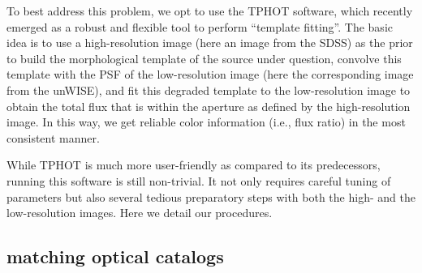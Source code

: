 \documentclass[numberedappendix,apj,twocolumn]{emulateapj}
\begin{document}
To best address this problem, we opt to use the TPHOT software, which recently emerged as a robust and flexible tool to perform ``template fitting''. The basic idea is to use a high-resolution image (here an image from the SDSS) as the prior to build the morphological template of the source under question, convolve this template with the PSF of the low-resolution image (here the corresponding image from the unWISE), and fit this degraded template to the low-resolution image to obtain the total flux that is within the aperture as defined by the high-resolution image. In this way, we get reliable color information (i.e., flux ratio) in the most consistent manner. 

While TPHOT is much more user-friendly as compared to its predecessors, running this software is still non-trivial. It not only requires careful tuning of parameters but also several tedious preparatory steps with both the high- and the low-resolution images. Here we detail our procedures.
	

\subsection{matching optical catalogs} 

\end{document}
